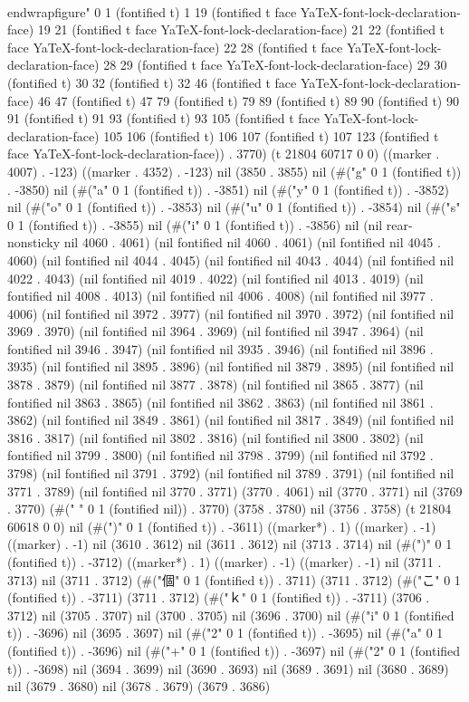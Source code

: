  \\end{wrapfigure}" 0 1 (fontified t) 1 19 (fontified t face YaTeX-font-lock-declaration-face) 19 21 (fontified t face YaTeX-font-lock-declaration-face) 21 22 (fontified t face YaTeX-font-lock-declaration-face) 22 28 (fontified t face YaTeX-font-lock-declaration-face) 28 29 (fontified t face YaTeX-font-lock-declaration-face) 29 30 (fontified t) 30 32 (fontified t) 32 46 (fontified t face YaTeX-font-lock-declaration-face) 46 47 (fontified t) 47 79 (fontified t) 79 89 (fontified t) 89 90 (fontified t) 90 91 (fontified t) 91 93 (fontified t) 93 105 (fontified t face YaTeX-font-lock-declaration-face) 105 106 (fontified t) 106 107 (fontified t) 107 123 (fontified t face YaTeX-font-lock-declaration-face)) . 3770) (t 21804 60717 0 0) ((marker . 4007) . -123) ((marker . 4352) . -123) nil (3850 . 3855) nil (#("g" 0 1 (fontified t)) . -3850) nil (#("a" 0 1 (fontified t)) . -3851) nil (#("y" 0 1 (fontified t)) . -3852) nil (#("o" 0 1 (fontified t)) . -3853) nil (#("u" 0 1 (fontified t)) . -3854) nil (#("s" 0 1 (fontified t)) . -3855) nil (#("i" 0 1 (fontified t)) . -3856) nil (nil rear-nonsticky nil 4060 . 4061) (nil fontified nil 4060 . 4061) (nil fontified nil 4045 . 4060) (nil fontified nil 4044 . 4045) (nil fontified nil 4043 . 4044) (nil fontified nil 4022 . 4043) (nil fontified nil 4019 . 4022) (nil fontified nil 4013 . 4019) (nil fontified nil 4008 . 4013) (nil fontified nil 4006 . 4008) (nil fontified nil 3977 . 4006) (nil fontified nil 3972 . 3977) (nil fontified nil 3970 . 3972) (nil fontified nil 3969 . 3970) (nil fontified nil 3964 . 3969) (nil fontified nil 3947 . 3964) (nil fontified nil 3946 . 3947) (nil fontified nil 3935 . 3946) (nil fontified nil 3896 . 3935) (nil fontified nil 3895 . 3896) (nil fontified nil 3879 . 3895) (nil fontified nil 3878 . 3879) (nil fontified nil 3877 . 3878) (nil fontified nil 3865 . 3877) (nil fontified nil 3863 . 3865) (nil fontified nil 3862 . 3863) (nil fontified nil 3861 . 3862) (nil fontified nil 3849 . 3861) (nil fontified nil 3817 . 3849) (nil fontified nil 3816 . 3817) (nil fontified nil 3802 . 3816) (nil fontified nil 3800 . 3802) (nil fontified nil 3799 . 3800) (nil fontified nil 3798 . 3799) (nil fontified nil 3792 . 3798) (nil fontified nil 3791 . 3792) (nil fontified nil 3789 . 3791) (nil fontified nil 3771 . 3789) (nil fontified nil 3770 . 3771) (3770 . 4061) nil (3770 . 3771) nil (3769 . 3770) (#(" " 0 1 (fontified nil)) . 3770) (3758 . 3780) nil (3756 . 3758) (t 21804 60618 0 0) nil (#(")" 0 1 (fontified t)) . -3611) ((marker*) . 1) ((marker) . -1) ((marker) . -1) nil (3610 . 3612) nil (3611 . 3612) nil (3713 . 3714) nil (#(")" 0 1 (fontified t)) . -3712) ((marker*) . 1) ((marker) . -1) ((marker) . -1) nil (3711 . 3713) nil (3711 . 3712) (#("個" 0 1 (fontified t)) . 3711) (3711 . 3712) (#("こ" 0 1 (fontified t)) . -3711) (3711 . 3712) (#("ｋ" 0 1 (fontified t)) . -3711) (3706 . 3712) nil (3705 . 3707) nil (3700 . 3705) nil (3696 . 3700) nil (#("i" 0 1 (fontified t)) . -3696) nil (3695 . 3697) nil (#("2" 0 1 (fontified t)) . -3695) nil (#("a" 0 1 (fontified t)) . -3696) nil (#("+" 0 1 (fontified t)) . -3697) nil (#("2" 0 1 (fontified t)) . -3698) nil (3694 . 3699) nil (3690 . 3693) nil (3689 . 3691) nil (3680 . 3689) nil (3679 . 3680) nil (3678 . 3679) (3679 . 3686) 